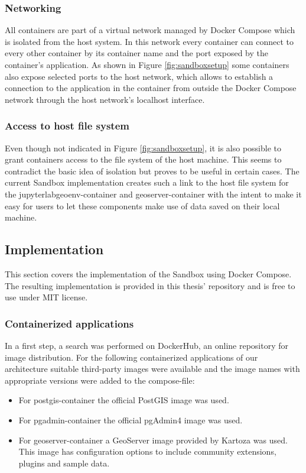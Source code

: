 \documentclass[11pt, a4paper, oneside, parskip=full-]{scrartcl}
\begin{document}
\subsubsection*{Networking}
All containers are part of a virtual network managed by Docker Compose which is
isolated from the host system. In this network every container can connect to
every other container by its container name and the port exposed by the
container's application. As shown in Figure \ref{fig:sandboxsetup} some
containers also expose selected ports to the host network, which allows to
establish a connection to the application in the container from outside the
Docker Compose network through the host network's localhost interface.

\subsubsection*{Access to host file system}
Even though not indicated in Figure \ref{fig:sandboxsetup}, it is also possible
to grant containers access to the file system of the host machine. This seems to
contradict the basic idea of isolation but proves to be useful in certain cases.
The current Sandbox implementation creates such a link to the host file system
for the jupyterlabgeoenv-container and geoserver-container with the intent to
make it easy for users to let these components make use of data saved on their
local machine.

\subsection{Implementation}

This section covers the implementation of the Sandbox using Docker Compose. The
resulting implementation is provided in this thesis'
repository\cite{osgeostacksandbox} and is free to use under MIT license.

\subsubsection*{Containerized applications}
In a first step, a search was performed on DockerHub\cite{dockerhub}, an online
repository for image distribution. For the following containerized applications
of our architecture suitable third-party images were available and the image
names with appropriate versions were added to the compose-file:

\begin{itemize}
  \item For postgis-container the official PostGIS image was
  used\cite{postgis-container}.
  \item For pgadmin-container the official pgAdmin4 image was
  used\cite{pgadmin-container}.
  \item For geoserver-container a GeoServer image provided by Kartoza was
  used\cite{geoserver-container}. This image has configuration options to
  include community extensions, plugins and sample data.
\end{itemize}
\end{document}
